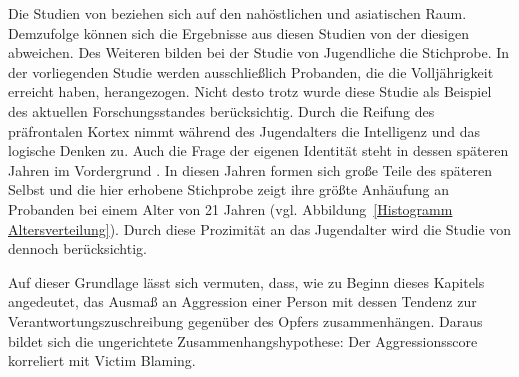 Die Studien von \textcite{H1_malasia_2012, H1_moderation_2020} beziehen sich auf den nahöstlichen und asiatischen Raum. Demzufolge können sich die Ergebnisse aus diesen Studien von der diesigen abweichen. Des Weiteren bilden bei der Studie von \textcite{H1_malasia_2012} Jugendliche die Stichprobe. In der vorliegenden Studie werden ausschließlich Probanden, die die Volljährigkeit erreicht haben, herangezogen. Nicht desto trotz wurde diese Studie als Beispiel des aktuellen Forschungsstandes berücksichtig. Durch die Reifung des präfrontalen Kortex nimmt während des Jugendalters die Intelligenz und das logische Denken zu. Auch die Frage der eigenen Identität steht in dessen späteren Jahren im Vordergrund \parencite{H1_Entwicklung}. In diesen Jahren formen sich große Teile des späteren Selbst und die hier erhobene Stichprobe zeigt ihre größte Anhäufung an Probanden bei einem Alter von 21 Jahren (vgl. Abbildung~\ref{Histogramm Altersverteilung}). Durch diese Prozimität an das Jugendalter wird die Studie von \textcite{H1_malasia_2012} dennoch berücksichtig.

Auf dieser Grundlage lässt sich vermuten, dass, wie zu Beginn dieses Kapitels angedeutet, das Ausmaß an Aggression einer Person mit dessen Tendenz zur Verantwortungszuschreibung gegenüber des Opfers zusammenhängen. Daraus bildet sich die ungerichtete Zusammenhangshypothese: Der Aggressionsscore korreliert mit Victim Blaming.